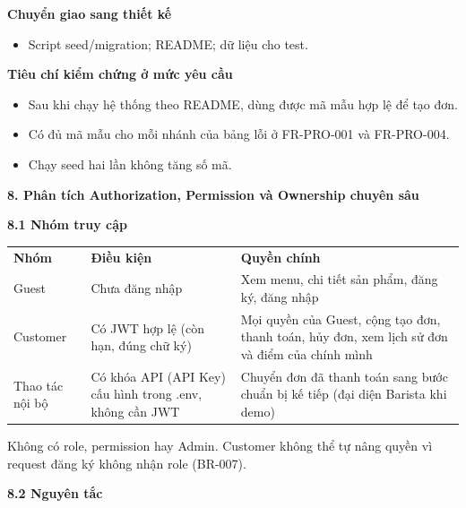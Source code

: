 \documentclass[11pt,a4paper,oneside]{report}
\begin{document}
\textbf{Chuyển giao sang thiết kế}

\begin{itemize}
\item
  Script seed/migration; README; dữ liệu cho test.
\end{itemize}

\textbf{Tiêu chí kiểm chứng ở mức yêu cầu}

\begin{itemize}
\item
  Sau khi chạy hệ thống theo README, dùng được mã mẫu hợp lệ để tạo đơn.
\item
  Có đủ mã mẫu cho mỗi nhánh của bảng lỗi ở FR-PRO-001 và FR-PRO-004.
\item
  Chạy seed hai lần không tăng số mã.
\end{itemize}

\textbf{8. Phân tích Authorization, Permission và Ownership chuyên sâu}

\textbf{8.1 Nhóm truy cập}

\begin{longtable}[]{@{}
  >{\raggedright\arraybackslash}p{}
  >{\raggedright\arraybackslash}p{}
  >{\raggedright\arraybackslash}p{}@{}}
\toprule\noalign{}
\endhead
\bottomrule\noalign{}
\endlastfoot
\textbf{Nhóm} & \textbf{Điều kiện} & \textbf{Quyền chính} \\
Guest & Chưa đăng nhập & Xem menu, chi tiết sản phẩm, đăng ký, đăng nhập \\
Customer & Có JWT hợp lệ (còn hạn, đúng chữ ký) & Mọi quyền của Guest, cộng tạo đơn, thanh toán, hủy đơn, xem lịch sử đơn và điểm của chính mình \\
Thao tác nội bộ & Có khóa API (API Key) cấu hình trong .env, không cần JWT & Chuyển đơn đã thanh toán sang bước chuẩn bị kế tiếp (đại diện Barista khi demo) \\
\end{longtable}

Không có role, permission hay Admin. Customer không thể tự nâng quyền vì request đăng ký không nhận role (BR-007).

\textbf{8.2 Nguyên tắc}
\end{document}
